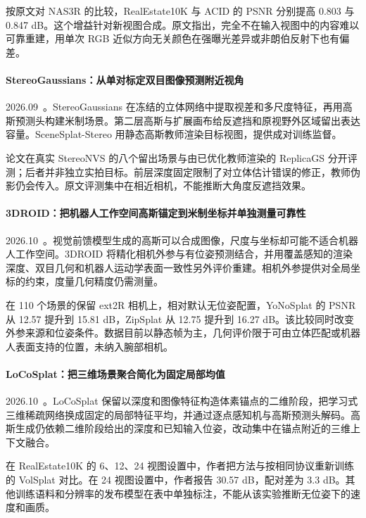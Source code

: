 按原文对 NAS3R 的比较，RealEstate10K 与 ACID 的 PSNR 分别提高 0.803 与 0.847 dB。这个增益针对新视图合成。原文指出，完全不在输入视图中的内容难以可靠重建，用单次 RGB 近似方向无关颜色在强曝光差异或非朗伯反射下也有偏差。

\paragraph{StereoGaussians：从单对标定双目图像预测附近视角}
2026.09~\cite{2609_38592}。StereoGaussians 在冻结的立体网络中提取视差和多尺度特征，再用高斯预测头构建米制场景。第二层高斯与扩展画布给反遮挡和原视野外区域留出表达容量。SceneSplat-Stereo 用静态高斯教师渲染目标视图，提供成对训练监督。

论文在真实 StereoNVS 的八个留出场景与由已优化教师渲染的 ReplicaGS 分开评测；后者并非独立实拍目标。前层深度固定限制了对立体估计错误的修正，教师伪影仍会传入。原文评测集中在相近相机，不能推断大角度反遮挡效果。

\paragraph{3DROID：把机器人工作空间高斯锚定到米制坐标并单独测量可靠性}
2026.10~\cite{2610_01744}。视觉前馈模型生成的高斯可以合成图像，尺度与坐标却可能不适合机器人工作空间。3DROID 将精化相机外参与有位姿预测结合，并用覆盖感知的渲染深度、双目几何和机器人运动学表面一致性另外评价重建。相机外参提供对全局坐标的约束，度量几何精度仍需测量。

在 110 个场景的保留 ext2R 相机上，相对默认无位姿配置，YoNoSplat 的 PSNR 从 12.57 提升到 15.81 dB，ZipSplat 从 12.75 提升到 16.27 dB。该比较同时改变外参来源和位姿条件。数据目前以静态帧为主，几何评价限于可由立体匹配或机器人表面支持的位置，未纳入腕部相机。

\paragraph{LoCoSplat：把三维场景聚合简化为固定局部均值}
2026.10~\cite{2610_04351}。LoCoSplat 保留以深度和图像特征构造体素锚点的二维阶段，把学习式三维稀疏网络换成固定的局部特征平均，并通过逐点感知机与高斯预测头解码。高斯生成仍依赖二维阶段给出的深度和已知输入位姿，改动集中在锚点附近的三维上下文融合。

在 RealEstate10K 的 6、12、24 视图设置中，作者把方法与按相同协议重新训练的 VolSplat 对比。在 24 视图设置中，作者报告 30.57 dB，配对差为 3.3 dB。其他训练语料和分辨率的发布模型在表中单独标注，不能从该实验推断无位姿下的速度和画质。

